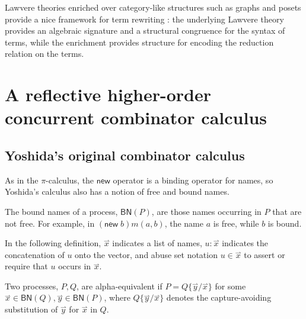 \documentclass{llncs}
\newcommand{\new}{\mathsf{new}}
\newcommand{\pic}{$\pi$-calculus}
\newcommand{\pzero}{\mathbin{0}}
\newcommand{\freenames}[1]{\mathbin{\mathsf{FN}(#1)}}
\newcommand{\boundnames}[1]{\mathbin{\mathsf{BN}(#1)}}
\newcommand{\bc}{\mathbin{\mathbf{::=}}}
\newcommand{\bm}{\mathbin{\mathbf\mid}}
\newcommand{\vect}[1]{\stackrel{\rightharpoonup}{#1}}
\begin{document}
Lawvere theories enriched over category-like structures such as graphs
and posets provide a nice framework for term rewriting
\cite{DBLP:conf/ctcs/LuethG97}: the underlying Lawvere theory provides
an algebraic signature and a structural congruence for the syntax of
terms, while the enrichment provides structure for encoding the
reduction relation on the terms.

\section{A reflective higher-order concurrent combinator calculus}

\subsection{Yoshida's original combinator calculus}


As in the {\pic}, the $\new$ operator is a binding operator
for names, so Yoshida's calculus also has a notion of free and bound names.


The bound names of a process, $\boundnames{P}$, are those names occurring in $P$
that are not free. For example, in $(\new\; b)m(a,b)$, the name $a$ is free, while $b$ is bound.

In the following definition, $\vect{x}$ indicates a list of names,
$u:\vect{x}$ indicates the concatenation of $u$ onto the vector, and
abuse set notation $u \in \vect{x}$ to assert or require that $u$
occurs in $\vect{x}$.

\begin{definition}
Two processes, $P,Q$, are alpha-equivalent if $P = Q\{\vect{y}/\vect{x}\}$ for
some $\vect{x} \in \boundnames{Q},\vect{y} \in \boundnames{P}$, where $Q\{\vect{y}/\vect{x}\}$
denotes the capture-avoiding substitution of $\vect{y}$ for $\vect{x}$ in $Q$.
\end{definition}
\end{document}

